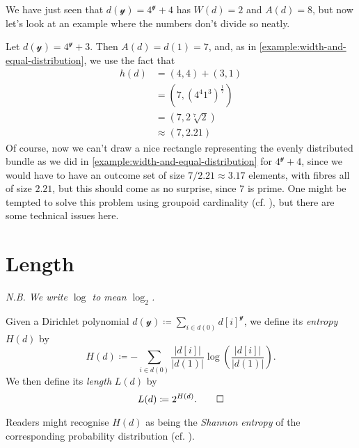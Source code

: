 \documentclass[11pt,fleqn]{article}
\newcommand{\yon}{\mathcal{y}}
\begin{document}
\begin{example}
\label{example:4-and-4-and-4-and-3}
  We have just seen that $d(\yon)=4^\yon+4$ has $W(d)=2$ and $A(d)=8$, but now let's look at an example where the numbers don't divide so neatly.
  
  Let $d(\yon)=4^\yon+3$.
  Then $A(d)=d(1)=7$, and, as in \cref{example:width-and-equal-distribution}, we use the fact that
  \[
    \begin{aligned}
      h(d)
      &= (4,4) + (3,1)
    \\&= \left(7,(4^4 1^3)^{\frac{1}{7}}\right)
    \\&= (7,2\sqrt[7]{2})
    \\&\approx (7,2.21)
    \end{aligned}
  \]
  Of course, now we can't draw a nice rectangle representing the evenly distributed bundle as we did in \cref{example:width-and-equal-distribution} for $4^\yon+4$, since we would have to have an outcome set of size $7/2.21\approx3.17$ elements, with fibres all of size $2.21$, but this should come as no surprise, since $7$ is prime.
  One might be tempted to solve this problem using groupoid cardinality (cf. \cite{BHW2009}), but there are some technical issues here.
\end{example}



\section{Length}
\label{section:length}

\emph{N.B. We write $\log$ to mean $\log_2$.}

\begin{definition}
  Given a Dirichlet polynomial $d(\yon)\coloneqq\sum_{i\in d(0)}d[i]^\yon$, we define its \emph{entropy} $H(d)$ by
  \[
    H(d) \coloneqq -\sum_{i\in d(0)} \frac{|d[i]|}{|d(1)|} \log\left(\frac{|d[i]|}{|d(1)|}\right).
  \]
  We then define its \emph{length} $L(d)$ by
  \[
    L(d)\coloneqq 2^{H(d)}.\qedhere
  \]
\end{definition}

Readers might recognise $H(d)$ as being the \emph{Shannon entropy} of the corresponding probability distribution (cf. \cite{S1948}).
\end{document}
